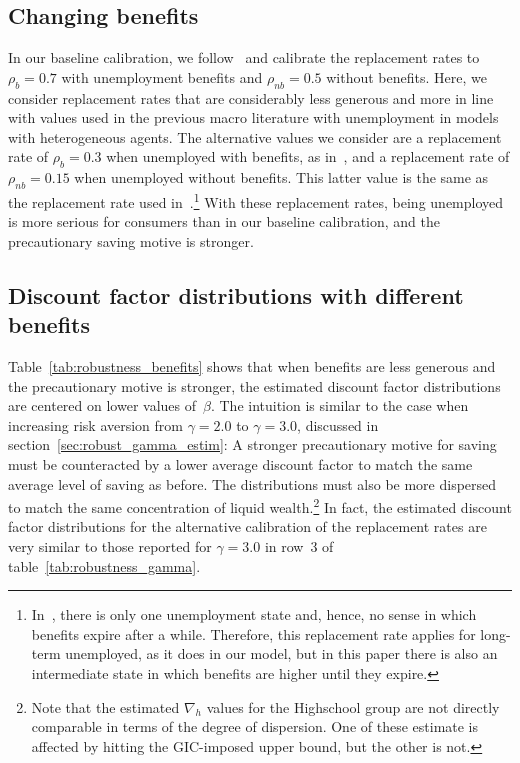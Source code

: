 \documentclass[\PathToRoot/\ProjectName]{subfiles}
\begin{document}
\hypertarget{changing-benefits}{}\subsection*{Changing benefits}
\whenintegrated{\label{sec:robust_benefits}} 

In our baseline calibration, we follow~\cite{rothstein2017scraping} and calibrate the replacement rates to $\rho_b=0.7$ with unemployment benefits and $\rho_{nb}=0.5$ without benefits.
Here, we consider replacement rates that are considerably less generous and more in line with values used in the previous macro literature with unemployment in models with heterogeneous agents.
The alternative values we consider are a replacement rate of $\rho_{b}=0.3$ when unemployed with benefits, as in~\cite{carroll2020modeling}, and a replacement rate of $\rho_{nb}=0.15$ when unemployed without benefits.
This latter value is the same as the replacement rate used in~\cite{den2010computational}.\footnote{In~\cite{den2010computational}, there is only one unemployment state and, hence, no sense in which benefits expire after a while.
  Therefore, this replacement rate applies for long-term unemployed, as it does in our model, but in this paper there is also an intermediate state in which benefits are higher until they expire.} With these replacement rates, being unemployed is more serious for consumers than in our baseline calibration, and the precautionary saving motive is stronger.

\subsection*{Discount factor distributions with different benefits}
\whenintegrated{\label{sec:robust_benefits_estim}} 

Table~\ref{tab:robustness_benefits} shows that when benefits are less generous and the precautionary motive is stronger, the estimated discount factor distributions are centered on lower values of~$\beta$.
The intuition is similar to the case when increasing risk aversion from $\gamma=2.0$ to $\gamma=3.0$, discussed in section~\ref{sec:robust_gamma_estim}: A stronger precautionary motive for saving must be counteracted by a lower average discount factor to match the same average level of saving as before.
The distributions must also be more dispersed to match the same concentration of liquid wealth.\footnote{Note that the estimated $\nabla_h$ values for the Highschool group are not directly comparable in terms of the degree of dispersion.
  One of these estimate is affected by hitting the GIC-imposed upper bound, but the other is not.} In fact, the estimated discount factor distributions for the alternative calibration of the replacement rates are very similar to those reported for $\gamma=3.0$ in row~3 of table~\ref{tab:robustness_gamma}.
\end{document}
